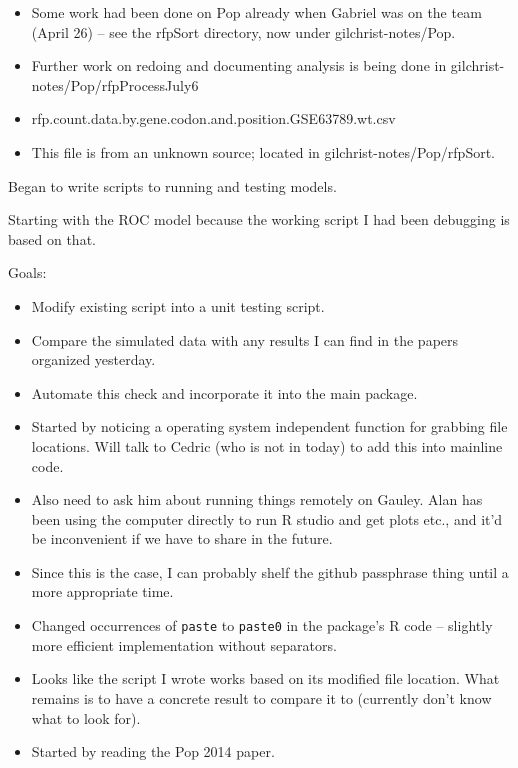 \documentclass[12pt,hyperref]{labbook}
\newcommand{\sep}{\discretionary{}{}{}} %
\begin{document}
\begin{itemize}
\begin{itemize}
        \item Some work had been done on Pop already when Gabriel was on the team (April 26) -- see the rfpSort directory, now under gilchrist-notes/Pop.
        \item Further work on redoing and documenting analysis is being done in gilchrist-notes/Pop/rfpProcessJuly6
        \item rfp\sep .\sep count\sep .\sep data\sep .\sep by\sep .\sep gene\sep .\sep codon\sep .\sep and\sep .\sep position\sep .\sep GSE63789\sep .\sep wt\sep .\sep csv
        \item This file is from an unknown source; located in gilchrist-notes/Pop/rfpSort.
    \end{itemize}
\end{itemize}


Began to write scripts to running and testing models.

Starting with the ROC model because the working script I had been debugging is based on that.

Goals:

\begin{itemize}
    \item Modify existing script into a unit testing script.
    \item Compare the simulated data with any results I can find in the papers organized yesterday.
    \item Automate this check and incorporate it into the main package.
\end{itemize}

\begin{itemize}
    \item Started by noticing a operating system independent function for grabbing file locations.
    Will talk to Cedric (who is not in today) to add this into mainline code.
    \item Also need to ask him about running things remotely on Gauley.
    Alan has been using the computer directly to run R studio and get plots etc., and it'd be inconvenient if we have to share in the future.
    \item Since this is the case, I can probably shelf the github passphrase thing until a more
appropriate time.
    \item Changed occurrences of \verb+paste+ to \verb+paste0+ in the package's R code -- slightly
more efficient implementation without separators.
    \item Looks like the script I wrote works based on its modified file location. 
    What remains is to have a concrete result to compare it to (currently don't know what to look for).
    \item Started by reading the Pop 2014 paper.
\end{itemize}
\end{document}
